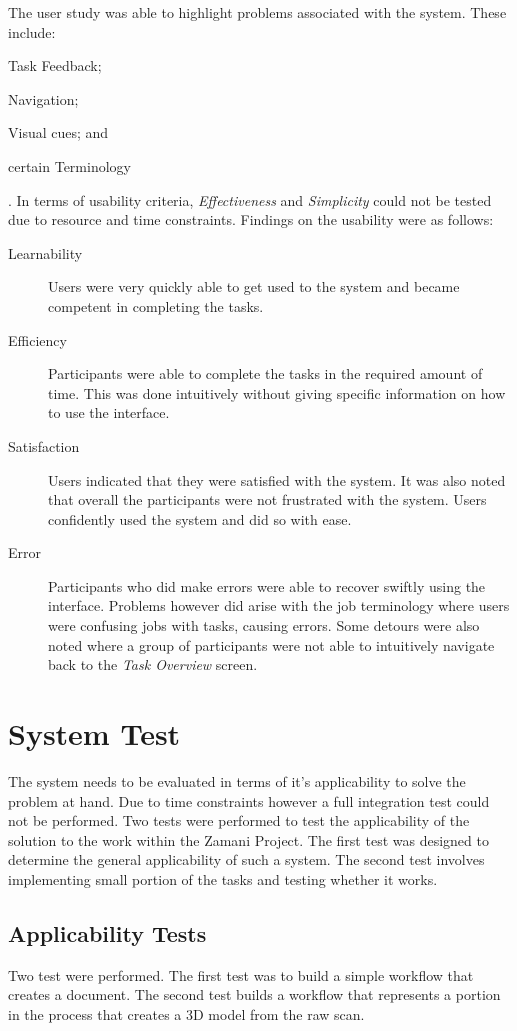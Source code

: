 \documentclass[12pt,a4paper]{report}
\begin{document}
The user study was able to highlight problems associated with the system. These
include: \begin{inparaenum}[(i)]\item Task Feedback; \item Navigation; \item
Visual cues; and \item certain Terminology\end{inparaenum}. In terms of
usability criteria, \emph{Effectiveness} and \emph{Simplicity} could not be
tested due to resource and time constraints. Findings on the usability were as
follows:

\begin{description}
\item[Learnability] Users were very quickly able to get used to the system and
	became competent in completing the tasks.
\item[Efficiency] Participants were able to complete the tasks in the required
	amount of time. This was done intuitively without giving specific
	information on how to use the interface.
\item[Satisfaction] Users indicated that they were satisfied with the system. It
	was also noted that overall the participants were not frustrated with
	the system. Users confidently used the system and did so with ease.
\item[Error] Participants who did make errors were able to recover swiftly
	using the interface. Problems however did arise with the job terminology
	where users were confusing jobs with tasks, causing errors. Some detours
	were also noted where a group of participants were not able to
	intuitively navigate back to the \emph{Task Overview} screen.
\end{description}



\section{System Test}
The system needs to be evaluated in terms of it's applicability to solve the
problem at hand. Due to time constraints however a full integration test could
not be performed. Two tests were performed to test the applicability of the
solution to the work within the Zamani Project. The first test was designed to
determine the general applicability of such a system. The second test involves
implementing small portion of the tasks and testing whether it works.
\subsection{Applicability Tests}
Two test were performed. The first test was to build a simple workflow that
creates a document. The second test builds a workflow that represents a portion
in the process that creates a 3D model from the raw scan.
\end{document}
